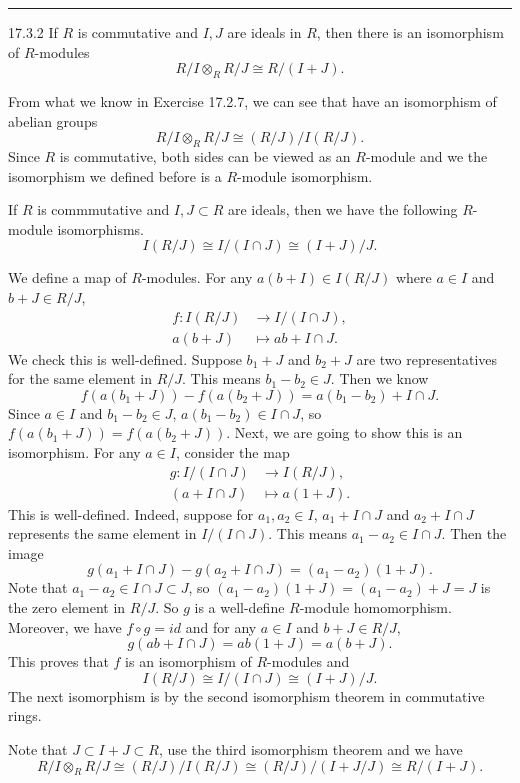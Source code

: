 \documentclass[a4paper, 12pt]{article}
\begin{document}
\noindent\rule{7in}{2.8pt}
\begin{problem}{17.3.2}
If \(R\) is commutative and \(I,J\) are ideals in \(R\), then there is an isomorphism of \(R\)-modules 
\[R/I\otimes_R R/J\cong R/(I+J).\]
\end{problem}
\begin{solution}
From what we know in Exercise 17.2.7, we can see that have an isomorphism of abelian groups 
\[R/I\otimes_R R/J\cong (R/J)/I(R/J).\]
Since \(R\) is commutative, both sides can be viewed as an \(R\)-module and we the isomorphism we defined before is a \(R\)-module isomorphism. 
\begin{claim}
If \(R\) is commmutative and \(I,J\subset R\) are ideals, then we have the following \(R\)-module isomorphisms.
\[I(R/J)\cong I/(I\cap J)\cong (I+J)/J.\]
\end{claim}
\begin{claimproof}
We define a map of \(R\)-modules. For any \(a(b+I)\in I(R/J)\) where \(a\in I\) and \(b+J\in R/J\),
\begin{align*}
	f:I(R/J)&\rightarrow I/(I\cap J),\\ 
	  a(b+J)&\mapsto ab+I\cap J.
\end{align*}
We check this is well-defined. Suppose \(b_1+J\) and \(b_2+J\) are two representatives for the same element in \(R/J\). This means \(b_1-b_2\in J\). Then we know 
\[f(a(b_1+J))-f(a(b_2+J))=a(b_1-b_2)+I\cap J.\]
Since \(a\in I\) and \(b_1-b_2\in J\), \(a(b_1-b_2)\in I\cap J\), so \(f(a(b_1+J))=f(a(b_2+J))\). Next, we are going to show this is an isomorphism. For any \(a\in I\), consider the map 
\begin{align*}
	g:I/(I\cap J )&\rightarrow I(R/J),\\ 
	  (a+I\cap J)&\mapsto a(1+J).
\end{align*}
This is well-defined. Indeed, suppose for \(a_1,a_2\in I\), \(a_1+I\cap J\) and \(a_2+I\cap J\) represents the same element in \(I/(I\cap J)\). This means \(a_1-a_2\in I\cap J\). Then the image 
\[g(a_1+I\cap J)-g(a_2+I\cap J)=(a_1-a_2)(1+J).\]
Note that \(a_1-a_2\in I\cap J\subset J\), so \((a_1-a_2)(1+J)=(a_1-a_2)+J=J\) is the zero element in \(R/J\). So \(g\) is a well-define \(R\)-module homomorphism. Moreover, we have 
\(f\circ g=id\) and for any \(a\in I\) and \(b+J\in R/J\), 
\[g(ab+I\cap J)=ab(1+J)=a(b+J).\]
This proves that \(f\) is an isomorphism of \(R\)-modules and 
\[I(R/J)\cong I/(I\cap J)\cong (I+J)/J.\]
The next isomorphism is by the second isomorphism theorem in commutative rings. 
\end{claimproof}

Note that \(J\subset I+J\subset R\), use the third isomorphism theorem and we have 
\[R/I\otimes_R R/J\cong (R/J)/I(R/J)\cong (R/J)/(I+J/J)\cong R/(I+J).\]
\end{solution}
\end{document}
